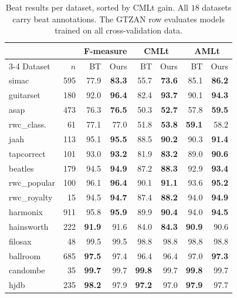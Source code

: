 \begin{table}[t]
  \centering
  \caption{Beat results per dataset, sorted by CMLt gain. All $18$ datasets carry beat annotations.
  The GTZAN row evaluates models trained on all cross-validation data.}
  \label{tab:perdatasetbeat}
  \footnotesize
  \setlength{\tabcolsep}{3.5pt}
  \begin{tabular}{@{}lr rr rr rr@{}}
    \hline
    & & \multicolumn{2}{c}{F-measure} & \multicolumn{2}{c}{CMLt} & \multicolumn{2}{c}{AMLt} \\
    \cline{3-4}\cline{5-6}\cline{7-8}
    Dataset & $n$ & BT & Ours & BT & Ours & BT & Ours \\
    \hline
    simac & 595 & 77.9 & \textbf{83.3} & 55.7 & \textbf{73.6} & 85.1 & \textbf{86.2} \\
    guitarset & 180 & 92.0 & \textbf{96.4} & 82.4 & \textbf{93.7} & 90.1 & \textbf{94.3} \\
    asap & 473 & 76.3 & \textbf{76.5} & 50.3 & \textbf{52.7} & 57.8 & \textbf{59.5} \\
    rwc\_class. & 61 & 77.1 & 77.0 & 51.8 & \textbf{53.8} & \textbf{59.1} & 58.2 \\
    jaah & 113 & 95.1 & \textbf{95.5} & 88.5 & \textbf{90.2} & 90.3 & \textbf{91.4} \\
    tapcorrect & 101 & 93.0 & \textbf{93.2} & 81.9 & \textbf{83.2} & 89.0 & \textbf{90.6} \\
    beatles & 179 & 94.5 & \textbf{94.9} & 87.2 & \textbf{88.3} & 92.9 & \textbf{93.4} \\
    rwc\_popular & 100 & 96.1 & \textbf{96.4} & 90.1 & \textbf{91.1} & 93.6 & \textbf{95.2} \\
    rwc\_royalty & 15 & 94.5 & \textbf{94.7} & 87.4 & \textbf{88.2} & 94.0 & \textbf{94.9} \\
    harmonix & 911 & 95.8 & \textbf{95.9} & 89.9 & \textbf{90.4} & 94.0 & \textbf{94.5} \\
    hainsworth & 222 & \textbf{91.9} & 91.6 & 84.0 & \textbf{84.3} & \textbf{90.9} & 90.6 \\
    filosax & 48 & 99.5 & 99.5 & 98.8 & 98.8 & 98.8 & 98.8 \\
    ballroom & 685 & \textbf{97.5} & 97.4 & 96.4 & 96.4 & 97.0 & \textbf{97.3} \\
    candombe & 35 & \textbf{99.7} & 99.7 & \textbf{99.8} & 99.7 & \textbf{99.8} & 99.7 \\
    hjdb & 235 & \textbf{98.2} & 97.9 & \textbf{97.2} & 97.0 & \textbf{97.9} & 97.7 \\

\end{tabular}
\end{table}

